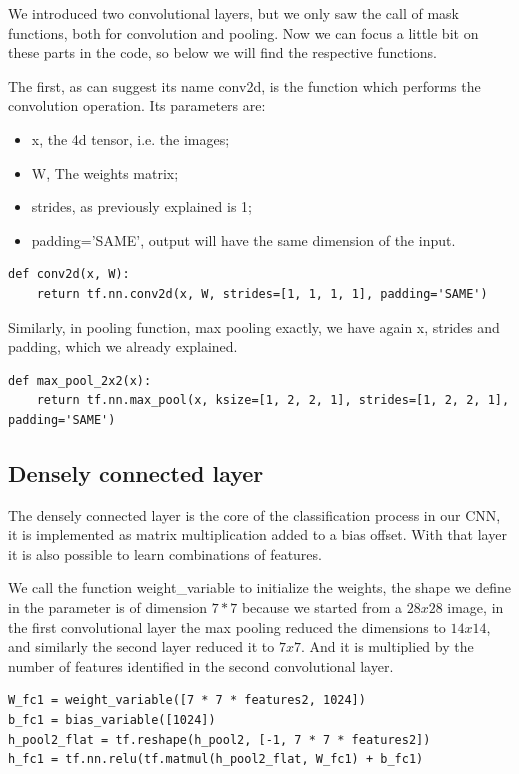 We introduced two convolutional layers, but we only saw the call of mask functions, both for convolution and pooling. Now we can focus a little bit on these parts in the code, so below we will find the respective functions.

The first, as can suggest its name conv2d, is the function which performs the convolution operation. Its parameters are:

\begin{itemize}
	\item x, the 4d tensor, i.e. the images;
	\item W, The weights matrix;
	\item strides, as previously explained is 1;
	\item padding='SAME', output will have the same dimension of the input.
\end{itemize}

\begin{lstlisting}
def conv2d(x, W):
	return tf.nn.conv2d(x, W, strides=[1, 1, 1, 1], padding='SAME')
\end{lstlisting}

Similarly, in pooling function, max pooling exactly, we have again x, strides and padding, which we already explained.

\begin{lstlisting}
def max_pool_2x2(x):
	return tf.nn.max_pool(x, ksize=[1, 2, 2, 1], strides=[1, 2, 2, 1], padding='SAME')
\end{lstlisting}

\subsection{Densely connected layer}

The densely connected layer is the core of the classification process in our \acs{CNN}, it is implemented as matrix multiplication added to a bias offset. With that layer it is also possible to learn combinations of features.

We call the function weight\_variable to initialize the weights, the shape we define in the parameter is of dimension $7*7$ because we started from a $28x28$ image, in the first convolutional layer the max pooling reduced the dimensions to $14x14$, and similarly the second layer reduced it to $7x7$. And it is multiplied by the number of features identified in the second convolutional layer.

\begin{lstlisting}
W_fc1 = weight_variable([7 * 7 * features2, 1024])
b_fc1 = bias_variable([1024])
h_pool2_flat = tf.reshape(h_pool2, [-1, 7 * 7 * features2])
h_fc1 = tf.nn.relu(tf.matmul(h_pool2_flat, W_fc1) + b_fc1)
\end{lstlisting}

